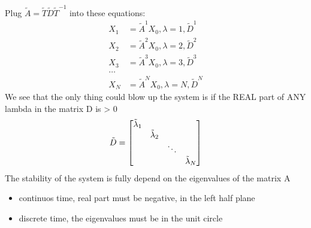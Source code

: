 \documentclass{article}
\begin{document}
Plug $ \tilde{A} = \tilde{T}\tilde{D}{\tilde{T}}^{-1}$ into these equations:
\begin{equation}
  \begin{aligned}
    X_{1}  & = {\tilde{A}}^{1}X_{0}, \lambda = 1, {\tilde{D}}^{1}\\
    X_{2}  & = {\tilde{A}}^{2}X_{0}, \lambda = 2, {\tilde{D}}^{2}\\
    X_{3}  & = {\tilde{A}}^{3}X_{0}, \lambda = 3, {\tilde{D}}^{3}\\
    \ldots\\
    X_{N}  & = {\tilde{A}}^{N}X_{0}, \lambda = N, {\tilde{D}}^{N}
  \end{aligned}  
\end{equation} 
We see that the only thing could blow up the system is if the REAL part of ANY lambda in the matrix D is > 0
\begin{equation} 
  \tilde{D} = 
  \begin{bmatrix}
      $$\tilde{\lambda}_{1}$$ &  &  &\\ 
      & $$\tilde{\lambda}_{2}$$   &  &\\ 
      & & \ddots & \\ 
      & & & $$\tilde{\lambda}_{N}$$
  \end{bmatrix}
\end{equation}
The stability of the system is fully depend on the eigenvalues of the matrix A
\begin{itemize}
  \item continuos time, real part must be negative, in the left half plane
  \item discrete time, the eigenvalues must be in the unit circle
\end{itemize}
\end{document}
